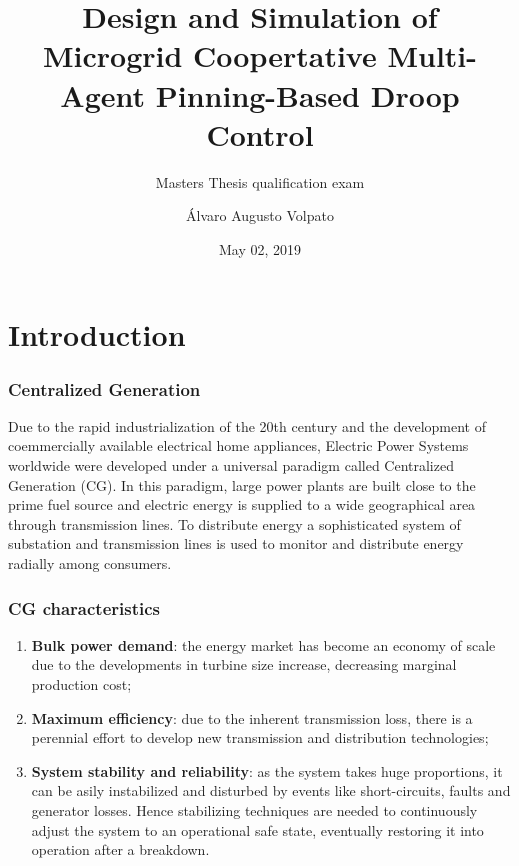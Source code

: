\documentclass[10pt, compress,xcolor={svgnames,dvipsnames,x11names}]{beamer}
\title{Design and Simulation of Microgrid Coopertative Multi-Agent Pinning-Based Droop Control}
\subtitle{Masters Thesis qualification exam}
\date{May 02, 2019}
\author{Álvaro Augusto Volpato}
\institute{
Advisor Prof. Luís Fernando C. Alberto\\
São Carlos School of Engineering\\
University of São Paulo\\
Department of Electrical and Computer Engineering 
}
\begin{document}
\maketitle

\section{Introduction}%

\begin{frame}%
\frametitle{Centralized Generation}

	Due to the rapid industrialization of the 20th century and the development of coemmercially available electrical home appliances, Electric Power Systems worldwide were developed under a universal paradigm called Centralized Generation (CG). In this paradigm, large power plants are built close to the prime fuel source and electric energy is supplied to a wide geographical area through transmission lines. To distribute energy a sophisticated system of substation and transmission lines is used to monitor and distribute energy radially among consumers.
	
\end{frame}%

\begin{frame}%
\frametitle{CG characteristics}

\begin{enumerate}[<+->]
	\item \textbf{Bulk power demand}: the energy market has become an economy of scale due to the developments in turbine size increase, decreasing marginal production cost;
%
	\item \textbf{Maximum efficiency}: due to the inherent transmission loss, there is a perennial effort to develop new transmission and distribution technologies;
%
	\item \textbf{System stability and reliability}: as the system takes huge proportions, it can be asily instabilized and disturbed by events like short-circuits, faults and generator losses. Hence stabilizing techniques are needed to continuously adjust the system to an operational safe state, eventually restoring it into operation after a breakdown.
\end{enumerate}
	
\end{frame}%
\end{document}
